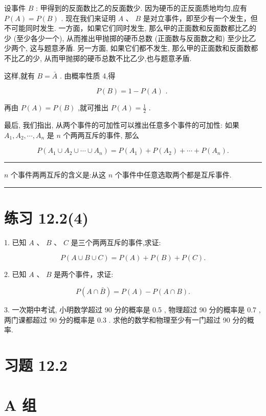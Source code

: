 \documentclass[10pt]{article}
\newcommand{\HRule}{\begin{center}\rule{0.9\linewidth}{0.2mm}\end{center}}
\begin{document}
设事件 \(B\) : 甲得到的反面数比乙的反面数少. 因为硬币的正反面质地均匀,应有 \(P\left( A\right)  = P\left( B\right)\) . 现在我们来证明 \(A\text{ 、 }B\) 是对立事件，即至少有一个发生，但不可能同时发生. 一方面，如果它们同时发生, 那么甲的正面数和反面数都比乙的少 (至少各少一个), 从而推出甲抛掷的硬币总数 (正面数与反面数之和) 至少比乙少两个, 这与题意矛盾. 另一方面, 如果它们都不发生, 那么甲的正面数和反面数都不比乙的少, 从而甲抛掷的硬币总数不比乙少,也与题意矛盾.

这样,就有 \(B = \bar{A}\) . 由概率性质 4,得

\[
P\left( B\right)  = 1 - P\left( A\right) \text{ . }
\]

再由 \(P\left( A\right)  = P\left( B\right)\) ,就可推出 \(P\left( A\right)  = \frac{1}{2}\) .

最后, 我们指出, 从两个事件的可加性可以推出任意多个事件的可加性: 如果 \({A}_{1},{A}_{2},\cdots ,{A}_{n}\) 是 \(n\) 个两两互斥的事件, 那么

\[
P\left( {{A}_{1} \cup  {A}_{2} \cup  \cdots  \cup  {A}_{n}}\right)  = P\left( {A}_{1}\right)  + P\left( {A}_{2}\right)  + \cdots  + P\left( {A}_{n}\right) .
\]

\HRule

\(n\) 个事件两两互斥的含义是:从这 \(n\) 个事件中任意选取两个都是互斥事件.

\HRule

\section*{练习 12.2(4)}

1. 已知 \(A\text{ 、 }B\text{ 、 }C\) 是三个两两互斥的事件,求证:

\[
P\left( {A \cup  B \cup  C}\right)  = P\left( A\right)  + P\left( B\right)  + P\left( C\right) .
\]

2. 已知 \(A\) 、 \(B\) 是两个事件，求证:

\[
P\left( {A \cap  \bar{B}}\right)  = P\left( A\right)  - P\left( {A \cap  B}\right) .
\]

3. 一次期中考试, 小明数学超过 90 分的概率是 0.5 , 物理超过 90 分的概率是 0.7 , 两门课都超过 90 分的概率是 0.3 . 求他的数学和物理至少有一门超过 90 分的概率.

\section*{习题 12.2}

\section*{A 组}
\end{document}
